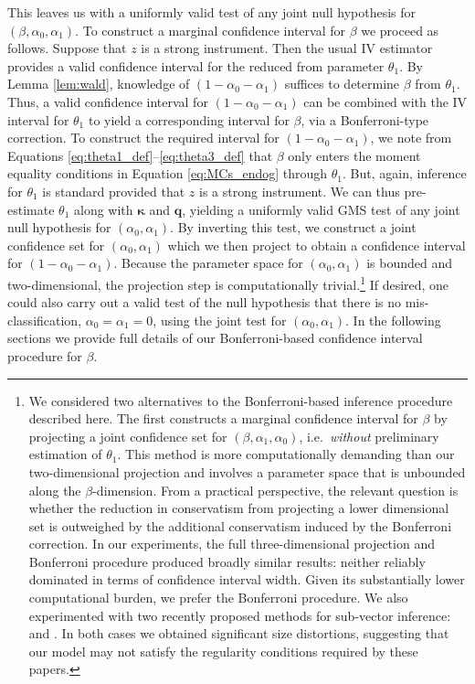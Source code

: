 This leaves us with a uniformly valid test of any joint null hypothesis for $(\beta, \alpha_0, \alpha_1)$.
To construct a marginal confidence interval for $\beta$ we proceed as follows.
Suppose that $z$ is a strong instrument.
Then the usual IV estimator provides a valid confidence interval for the reduced from parameter $\theta_1$.
By Lemma \ref{lem:wald}, knowledge of $(1 - \alpha_0 - \alpha_1)$ suffices to determine $\beta$ from $\theta_1$.
Thus, a valid confidence interval for $(1 - \alpha_0 - \alpha_1)$ can be combined with the IV interval for $\theta_1$ to yield a corresponding interval for $\beta$, via a Bonferroni-type correction.
To construct the required interval for $(1 - \alpha_0 - \alpha_1)$, we note from Equations \ref{eq:theta1_def}--\ref{eq:theta3_def}  that $\beta$ only enters the moment equality conditions in Equation \ref{eq:MCs_endog} through $\theta_1$.
But, again, inference for $\theta_1$ is standard provided that $z$ is a strong instrument.
We can thus pre-estimate $\theta_1$ along with $\boldsymbol{\kappa}$ and $\mathbf{q}$, yielding a uniformly valid GMS test of any joint null hypothesis for $(\alpha_0, \alpha_1)$.
By inverting this test, we construct a joint confidence set for $(\alpha_0, \alpha_1)$ which we then project to obtain a confidence interval for $(1 - \alpha_0 - \alpha_1)$. 
Because the parameter space for $(\alpha_0, \alpha_1)$ is bounded and two-dimensional, the projection step is computationally trivial.\footnote{We considered two alternatives to the Bonferroni-based inference procedure described here.
  The first constructs a marginal confidence interval for $\beta$ by projecting a joint confidence set for $(\beta, \alpha_1, \alpha_0)$, i.e.\ \emph{without} preliminary estimation of $\theta_1$.
This method is more computationally demanding than our two-dimensional projection and involves a parameter space that is unbounded along the $\beta$-dimension.
From a practical perspective, the relevant question is whether the reduction in conservatism from projecting a lower dimensional set is outweighed by the additional conservatism induced by the Bonferroni correction. 
In our experiments, the full three-dimensional projection and Bonferroni procedure produced broadly similar results: neither reliably dominated in terms of confidence interval width.
Given its substantially lower computational burden, we prefer the Bonferroni procedure.
We also experimented with two recently proposed methods for sub-vector inference: \cite{kaido2016confidence} and \cite{BugniCanayShi}. In both cases we obtained significant size distortions, suggesting that our model may not satisfy the regularity conditions required by these papers.\label{foot:alternatives}}
If desired, one could also carry out a valid test of the null hypothesis that there is no mis-classification, $\alpha_0 = \alpha_1 = 0$, using the joint test for $(\alpha_0, \alpha_1)$. 
In the following sections we provide full details of our Bonferroni-based confidence interval procedure for $\beta$.



